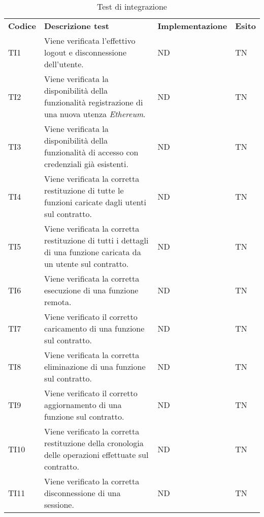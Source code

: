 \begin{longtable}{|C{1.5cm}|C{8cm}|C{3cm}|C{1cm}|}

	\caption{Test di integrazione}\\
	\hline

	\textbf{Codice} & \textbf{Descrizione test}  & \textbf{Implementazione}& \textbf{Esito}
	\tabularnewline
	\endfirsthead
	TI1 &
	Viene verificata l'effettivo logout e disconnessione dell'utente.  &
	ND & TN\\

	TI2 &
	Viene verificata la disponibilità della funzionalità registrazione di una nuova utenza \textit{Ethereum\glo}.  &
	ND & TN\\

	TI3 &
	Viene verificata la disponibilità della funzionalità di accesso con credenziali già esistenti.  &
	ND & TN\\

	TI4 &
	Viene verificata la corretta restituzione di tutte le funzioni caricate dagli utenti sul contratto.  &
	ND & TN \\

	TI5 &
	Viene verificata la corretta restituzione di tutti i dettagli di una funzione caricata da un utente sul contratto.  &
	ND & TN\\

	TI6 &
	Viene verificata la corretta esecuzione di una funzione remota.  &
	ND & TN\\

	TI7 &
	Viene verificato il corretto caricamento di una funzione sul contratto.  &
	ND & TN \\

	TI8 &
	Viene verificata la corretta eliminazione di una funzione sul contratto.  &
	ND & TN\\

	TI9 &
	Viene verificato il corretto aggiornamento di una funzione sul contratto.  &
	ND & TN\\

	TI10 &
	Viene verificato la corretta restituzione della cronologia delle operazioni effettuate sul contratto.  &
	ND & TN\\

	TI11 &
	Viene verificato la corretta disconnessione di una sessione.  &
	ND & TN\\

\end{longtable}

\newpage
